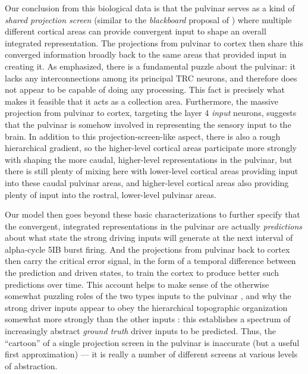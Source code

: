 \documentclass[11pt,twoside]{article}
\newif\myifpdf
\begin{document}
Our conclusion from this biological data is that the pulvinar serves as a kind of {\em shared projection screen} (similar to the {\em blackboard} proposal of ) where multiple different cortical areas can provide convergent input to shape an overall integrated representation.  The projections from pulvinar to cortex then share this converged information broadly back to the same areas that provided input in creating it.  As  emphasized, there is a fundamental puzzle about the pulvinar: it lacks any interconnections among its principal TRC neurons, and therefore does not appear to be capable of doing any processing.  This fact is precisely what makes it feasible that it acts as a collection area.  Furthermore, the massive projection from pulvinar to cortex, targeting the layer 4 {\em input} neurons, suggests that the pulvinar is somehow involved in representing the sensory input to the brain.  In addition to this projection-screen-like aspect, there is also a rough hierarchical gradient, so the higher-level cortical areas participate more strongly with shaping the more caudal, higher-level representations in the pulvinar, but there is still plenty of mixing here with lower-level cortical areas providing input into these caudal pulvinar areas, and higher-level cortical areas also providing plenty of input into the rostral, lower-level pulvinar areas.

Our model then goes beyond these basic characterizations to further specify that the convergent, integrated representations in the pulvinar are actually {\em predictions} about what state the strong driving inputs will generate at the next interval of alpha-cycle 5IB burst firing.  And the projections from pulvinar back to cortex then carry the critical error signal, in the form of a temporal difference between the prediction and driven states, to train the cortex to produce better such predictions over time.  This account helps to make sense of the otherwise somewhat puzzling roles of the two types inputs to the pulvinar \cite{ShermanGuillery06}, and why the strong driver inputs appear to obey the hierarchical topographic organization somewhat more strongly than the other inputs \cite{Rockland98a,Rockland96}: this establishes a spectrum of increasingly abstract {\em ground truth} driver inputs to be predicted.  Thus, the ``cartoon'' of a single projection screen in the pulvinar is inaccurate (but a useful first approximation) --- it is really a number of different screens at various levels of abstraction.
\end{document}
